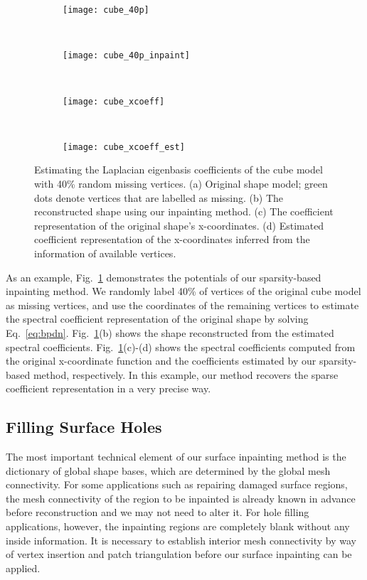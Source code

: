 \begin{figure}
    \centering
    \begin{subfigure}[b]{0.36\linewidth}
        \texttt{[image: cube\_40p]}
        \caption{}
    \end{subfigure}%
    ~
    \begin{subfigure}[b]{0.36\linewidth}
        \texttt{[image: cube\_40p\_inpaint]}
        \caption{}
    \end{subfigure}%
    \\
    \begin{subfigure}[b]{0.4\linewidth}
        \texttt{[image: cube\_xcoeff]}
        \caption{}
    \end{subfigure}%
    ~
    \begin{subfigure}[b]{0.4\linewidth}
        \texttt{[image: cube\_xcoeff\_est]}
        \caption{}
    \end{subfigure}%
    \caption{Estimating the Laplacian eigenbasis coefficients of the
      cube model with 40\% random missing vertices. (a) Original shape model;
      green dots denote vertices that are labelled as missing. (b) The
      reconstructed shape using our inpainting method. (c) The
      coefficient representation of the original shape's
      x-coordinates. (d) Estimated coefficient representation of the
      x-coordinates inferred from the information of available
      vertices. }
\label{fig:cube:random:inpaint}
\end{figure}

As an example, Fig.~\ref{fig:cube:random:inpaint} demonstrates the
potentials of our sparsity-based inpainting method. We randomly label
40\% of vertices of the original cube model as missing vertices, and
use the coordinates of the remaining vertices to estimate the spectral
coefficient representation of the original shape by solving
Eq.~\ref{eq:bpdn}. Fig.~\ref{fig:cube:random:inpaint}(b) shows the
shape reconstructed from the estimated spectral coefficients.
Fig.~\ref{fig:cube:random:inpaint}(c)-(d) shows the spectral
coefficients computed from the original x-coordinate function and the
coefficients estimated by our sparsity-based method, respectively. In
this example, our method recovers the sparse coefficient
representation in a very precise way.


\subsection{Filling Surface Holes}
\label{sec:holefilling}
The most important technical element of our surface inpainting method
is the dictionary of global shape bases, which are determined by the
global mesh connectivity. For some applications such as repairing
damaged surface regions, the mesh connectivity of the region to be
inpainted is already known in advance before reconstruction and we may
not need to alter it. For hole filling applications, however, the
inpainting regions are completely blank without any inside
information. It is necessary to establish interior mesh connectivity
by way of vertex insertion and patch triangulation before our surface
inpainting can be applied.

